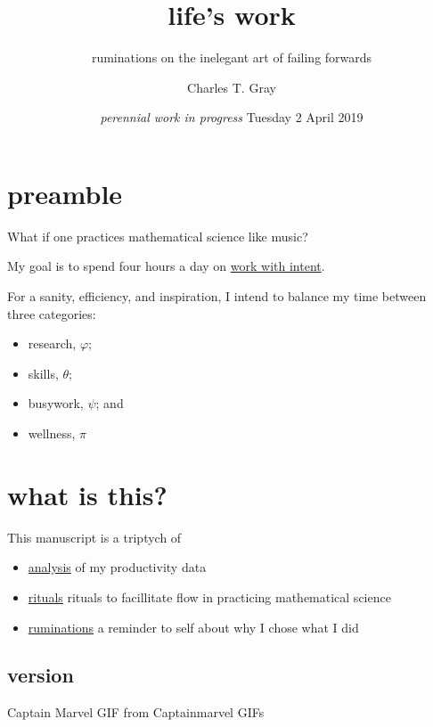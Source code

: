 \documentclass[]{book}
\title{life's work}
\subtitle{ruminations on the inelegant art of failing forwards}
\author{Charles T. Gray}
\date{\emph{perennial work in progress} Tuesday 2 April 2019}
\providecommand{\tightlist}{%
  \setlength{\itemsep}{0pt}\setlength{\parskip}{0pt}}
\begin{document}
\maketitle

{
\setcounter{tocdepth}{1}
\tableofcontents
}
\hypertarget{preamble}{%
\chapter{preamble}\label{preamble}}

What if one practices mathematical science like music?

My goal is to spend four hours a day on \protect\hyperlink{work-with-intent}{work with intent}.

For a sanity, efficiency, and inspiration, I intend to balance my time between three categories:

\begin{itemize}
\tightlist
\item
  research, \(\varphi\);
\item
  skills, \(\theta\);\\
\item
  busywork, \(\psi\); and
\item
  wellness, \(\pi\)
\end{itemize}

\hypertarget{what-is-this}{%
\chapter{what is this?}\label{what-is-this}}

This manuscript is a triptych of

\begin{itemize}
\tightlist
\item
  \protect\hyperlink{analysis}{analysis} of my productivity data
\item
  \protect\hyperlink{rituals}{rituals} rituals to facillitate flow in practicing mathematical science
\item
  \protect\hyperlink{ruminations}{ruminations} a reminder to self about why I chose what I did
\end{itemize}

\hypertarget{version}{%
\section{version}\label{version}}

Captain Marvel GIF from Captainmarvel GIFs
\end{document}
